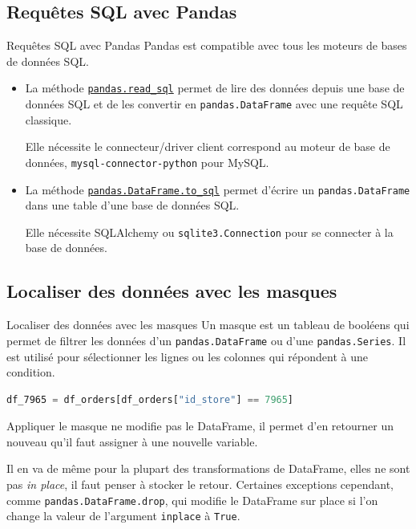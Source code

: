 \documentclass{beamer}
\begin{document}
    \subsection{Requêtes SQL avec Pandas}
    \begin{frame}{Requêtes SQL avec Pandas}
        Pandas est compatible avec tous les moteurs de bases de données SQL.
        \begin{itemize}
            \item La méthode \href{https://pandas.pydata.org/docs/reference/api/pandas.read_sql.html}{\lstinline{pandas.read_sql}} permet de lire des données depuis une base de données SQL et de les convertir en \lstinline{pandas.DataFrame} avec une requête SQL classique.
            \begin{dangercolorbox}
                Elle nécessite le connecteur/driver client correspond au moteur de base de données, \lstinline{mysql-connector-python} pour MySQL.
            \end{dangercolorbox}
            \item La méthode \href{https://pandas.pydata.org/docs/reference/api/pandas.DataFrame.to_sql.html}{\lstinline{pandas.DataFrame.to_sql}} permet d'écrire un \lstinline{pandas.DataFrame} dans une table d'une base de données SQL.
            \begin{dangercolorbox}
                Elle nécessite SQLAlchemy ou \lstinline{sqlite3.Connection} pour se connecter à la base de données.
            \end{dangercolorbox}
        \end{itemize}
    \end{frame}

    \subsection{Localiser des données avec les masques}
    \begin{frame}[fragile]{Localiser des données avec les masques}
        Un masque est un tableau de booléens qui permet de filtrer les données d'un \lstinline{pandas.DataFrame} ou d'une \lstinline{pandas.Series}.
        Il est utilisé pour sélectionner les lignes ou les colonnes qui répondent à une condition.
        \bigbreak
        \begin{lstlisting}[language=python]
df_7965 = df_orders[df_orders["id_store"] == 7965]
        \end{lstlisting}
        \begin{dangercolorbox}
            Appliquer le masque ne modifie pas le DataFrame, il permet d'en retourner un nouveau qu'il faut assigner à une nouvelle variable.

            Il en va de même pour la plupart des transformations de DataFrame, elles ne sont pas \textit{in place}, il faut penser à stocker le retour.
            Certaines exceptions cependant, comme \lstinline{pandas.DataFrame.drop}, qui modifie le DataFrame sur place si l'on change la valeur de l'argument \lstinline{inplace} à \lstinline{True}.
        \end{dangercolorbox}
    \end{frame}
\end{document}
